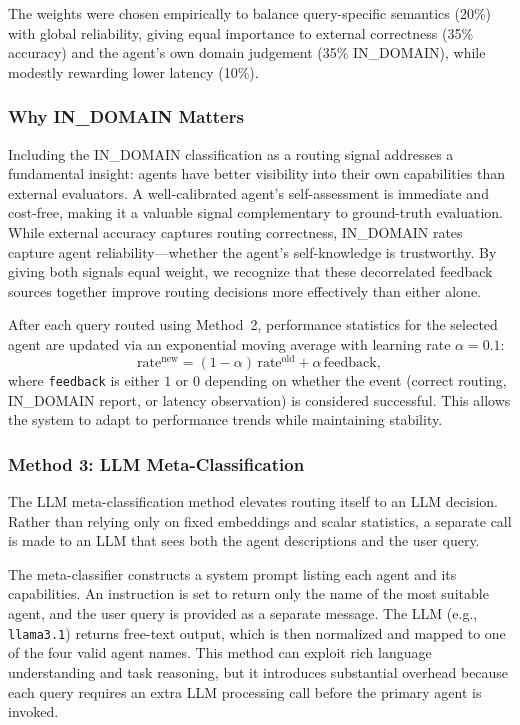 \documentclass[11pt]{article}
\begin{document}
The weights were chosen empirically to balance query-specific semantics (20\%) with global reliability, giving equal importance to external correctness (35\% accuracy) and the agent's own domain judgement (35\% IN\_DOMAIN), while modestly rewarding lower latency (10\%).

\subsubsection*{Why IN\_DOMAIN Matters}

Including the IN\_DOMAIN classification as a routing signal addresses a fundamental insight: agents have better visibility into their own capabilities than external evaluators. A well-calibrated agent's self-assessment is immediate and cost-free, making it a valuable signal complementary to ground-truth evaluation. While external accuracy captures routing correctness, IN\_DOMAIN rates capture agent reliability—whether the agent's self-knowledge is trustworthy. By giving both signals equal weight, we recognize that these decorrelated feedback sources together improve routing decisions more effectively than either alone.

After each query routed using Method~2, performance statistics for the selected agent are updated via an exponential moving average with learning rate $\alpha = 0.1$:
\begin{equation}
    \text{rate}^{\text{new}} =
    (1 - \alpha)\,\text{rate}^{\text{old}} + \alpha\,\text{feedback},
\end{equation}
where \texttt{feedback} is either $1$ or $0$ depending on whether the event (correct routing, IN\_DOMAIN report, or latency observation) is considered successful. This allows the system to adapt to performance trends while maintaining stability.

\subsubsection{Method 3: LLM Meta-Classification}

The LLM meta-classification method elevates routing itself to an LLM decision. Rather than relying only on fixed embeddings and scalar statistics, a separate call is made to an LLM that sees both the agent descriptions and the user query.

The meta-classifier constructs a system prompt listing each agent and its capabilities. An instruction is set to return only the name of the most suitable agent, and the user query is provided as a separate message. The LLM (e.g., \texttt{llama3.1}) returns free-text output, which is then normalized and mapped to one of the four valid agent names. This method can exploit rich language understanding and task reasoning, but it introduces substantial overhead because each query requires an extra LLM processing call before the primary agent is invoked.
\end{document}

